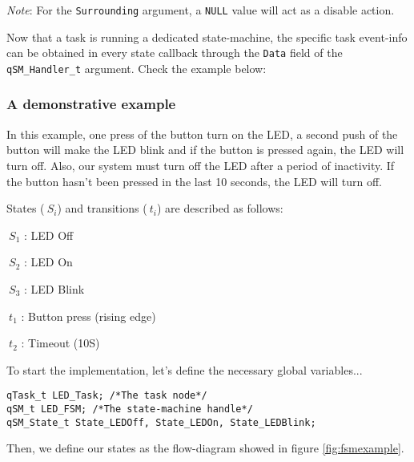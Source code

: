 \begin{tcolorbox}
\ArrowBoldDownRight \textit{Note}: For the \lstinline{Surrounding} argument, a \lstinline{NULL} value will act as a disable action.
\end{tcolorbox}

Now that a task is running a dedicated state-machine, the specific task event-info can be obtained in every state callback through the \lstinline{Data} field of the \lstinline{qSM_Handler_t} argument. Check the example below:
\medskip



\subsubsection{A demonstrative example} \label{fsm_example}
In this example, one press of the button turn on the LED, a second push of the button will make the LED blink and if the button is pressed again, the LED will turn off. Also, our system must turn off the LED after a period of inactivity. If the button hasn't been pressed in the last 10 seconds, the LED will turn off. 

States ($\ S_i$) and transitions ($\ t_i$) are described as follows: 
\medskip
\begin{itemize}
\begin{minipage}{0.4\linewidth}
    \item $\ S_1$ : LED Off
    \item $\ S_2$ : LED On
    \item $\ S_3$ : LED Blink
\end{minipage}
\begin{minipage}{0.4\linewidth}
    \item $\ t_1$ : Button press (rising edge)
    \item $\ t_2$ : Timeout (10S)
\end{minipage}
\end{itemize}



To start the implementation, let's define the necessary global variables...

\begin{lstlisting}[style=CStyle]
qTask_t LED_Task; /*The task node*/
qSM_t LED_FSM; /*The state-machine handle*/
qSM_State_t State_LEDOff, State_LEDOn, State_LEDBlink;
\end{lstlisting}

Then, we define our states as the flow-diagram showed in figure \ref{fig:fsmexample}.

